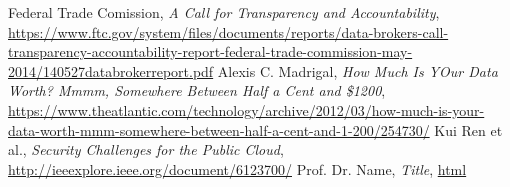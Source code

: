 \documentclass[11pt,twocolumn,a4paper,DIV=calc]{scrartcl}
\begin{document}
\begin{thebibliography}{99}
  Federal Trade Comission, \emph{A Call for Transparency and Accountability}, \url{https://www.ftc.gov/system/files/documents/reports/data-brokers-call-transparency-accountability-report-federal-trade-commission-may-2014/140527databrokerreport.pdf}
  Alexis C. Madrigal, \emph{How Much Is YOur Data Worth? Mmmm, Somewhere Between Half a Cent and \$1200}, \url{https://www.theatlantic.com/technology/archive/2012/03/how-much-is-your-data-worth-mmm-somewhere-between-half-a-cent-and-1-200/254730/}
  Kui Ren et al., \emph{Security Challenges for the Public Cloud}, \url{http://ieeexplore.ieee.org/document/6123700/}
  Prof. Dr. Name, \emph{Title}, \url{html}
\end{thebibliography}
\end{document}
